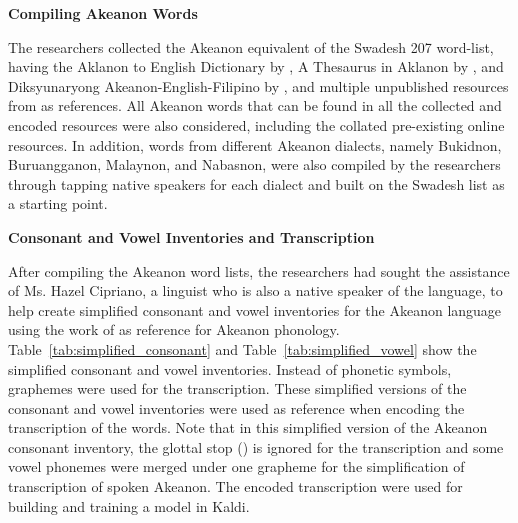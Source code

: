 \textbf{Compiling Akeanon Words}

The researchers collected the Akeanon equivalent of the Swadesh 207 word-list, having the Aklanon to English Dictionary by , A Thesaurus in Aklanon by , and Diksyunaryong Akeanon-English-Filipino by , and multiple unpublished resources from  as references. All Akeanon words that can be found in all the collected and encoded resources were also considered, including the collated pre-existing online resources. In addition, words from different Akeanon dialects, namely Bukidnon, Buruangganon, Malaynon, and Nabasnon, were also compiled by the researchers through tapping native speakers for each dialect and built on the Swadesh list as a starting point. 

\textbf{Consonant and Vowel Inventories and Transcription}

After compiling the Akeanon word lists, the researchers had sought the assistance of Ms. Hazel Cipriano, a linguist who is also a native speaker of the language, to help create simplified  consonant and vowel inventories for the Akeanon language using the work of  as reference for Akeanon phonology. Table~\ref{tab:simplified_consonant} and Table~\ref{tab:simplified_vowel} show the simplified consonant and vowel inventories. Instead of phonetic symbols, graphemes were used for the transcription. These simplified versions of the consonant and vowel inventories were used as reference when encoding the transcription of the words. Note that in this simplified version of the Akeanon consonant inventory, the glottal stop () is ignored for the transcription and some vowel phonemes were merged under one grapheme for the simplification of transcription of spoken Akeanon. The encoded transcription were used for building and training a model in Kaldi.

